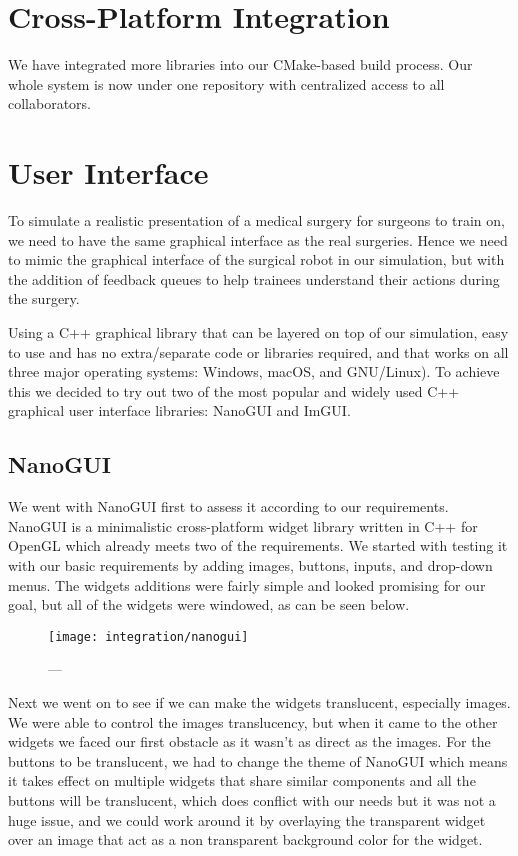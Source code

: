 \section{Cross-Platform Integration}\label{sec:cross}

We have integrated more libraries into our CMake-based build process. Our whole system is now under one repository with centralized access to all collaborators.

\section{User Interface}\label{sec:console}
To simulate a realistic presentation of a medical surgery for surgeons to train on, we need to have the same graphical interface as the real surgeries. Hence we need to mimic the graphical interface of the surgical robot in our simulation, but with the addition of feedback queues to help trainees understand their actions during the surgery.

Using a C++ graphical library that can be layered on top of our simulation, easy to use and has no extra/separate code or libraries required, and that works on all three major operating systems: Windows, macOS, and GNU/Linux). To achieve this we decided to try out two of the most popular and widely used C++ graphical user interface libraries: NanoGUI and ImGUI.

\subsection{NanoGUI}\label{ssec:nanogui}
We went with NanoGUI first to assess it according to our requirements. NanoGUI is a minimalistic cross-platform widget library written in C++ for OpenGL which already meets two of the requirements. We started with testing it with our basic requirements by adding images, buttons, inputs, and drop-down menus. The widgets additions were fairly simple and looked promising for our goal, but all of the widgets were windowed, as can be seen below.

\begin{figure}
  \centering%
  \texttt{[image: integration/nanogui]}
  \caption{---}\label{fig:}
\end{figure}

Next we went on to see if we can make the widgets translucent, especially images. We were able to control the images translucency, but when it came to the other widgets we faced our first obstacle as it wasn’t as direct as the images. For the buttons to be translucent, we had to change the theme of NanoGUI which means it takes effect on multiple widgets that share similar components and all the buttons will be translucent, which does conflict with our needs but it was not a huge issue, and we could work around it by overlaying the transparent widget over an image that act as a non transparent background color for the widget.

